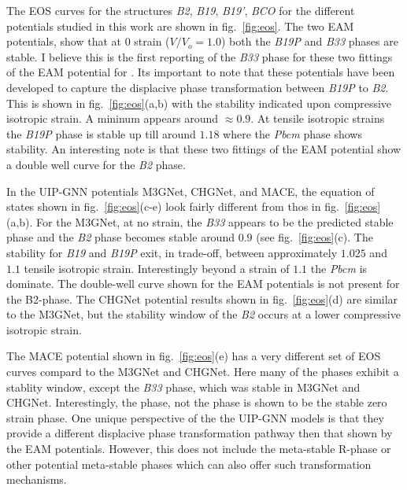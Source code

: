 \documentclass[preprint,colorlinks=true,linkcolor=black,citecolor=black]{elsarticle}
\begin{document}
The EOS curves for the  structures \textit{B2}, \textit{B19}, \textit{B19'}, \textit{BCO} for the different potentials studied in this work are shown in fig.~\ref{fig:eos}. The two EAM potentials, show that at 0 strain ($V/V_o = 1.0$) both the \textit{B19P} and \textit{B33} phases are stable. I believe this is the first reporting of the \textit{B33} phase for these two fittings of the EAM potential for . Its important to note that these potentials have been developed to capture the displacive phase transformation between \textit{B19P} to \textit{B2}. This is shown in fig.~\ref{fig:eos}(a,b) with the stability indicated upon compressive isotropic strain. A mininum appears around $\approx 0.9$. At tensile isotropic strains the \textit{B19P} phase is stable up till around $1.18$ where the \textit{Pbcm} phase shows stability. An interesting note is that these two fittings of the EAM potential show a double well curve for the \textit{B2} phase. \par

In the UIP-GNN potentials M3GNet, CHGNet, and MACE, the equation of states shown in fig.~\ref{fig:eos}(c-e) look fairly different from thos in fig.~\ref{fig:eos}(a,b). For the M3GNet,  at no strain, the \textit{B33} appears to be the predicted stable phase and the \textit{B2} phase becomes stable around $0.9$ (see fig.~\ref{fig:eos}(c). The stability for \textit{B19} and \textit{B19P} exit, in trade-off, between approximately $1.025$ and $1.1$ tensile isotropic strain. Interestingly beyond a strain of $1.1$ the \textit{Pbcm} is dominate. The double-well curve shown for the EAM potentials is not present for the B2-phase. The CHGNet potential results shown in fig.~\ref{fig:eos}(d) are similar to the M3GNet, but the stability window of the \textit{B2} occurs at a lower compressive isotropic strain. \par

The MACE potential shown in fig.~\ref{fig:eos}(e) has a very different set of EOS curves compard to the M3GNet and CHGNet. Here many of the phases exhibit a stablity window, except the \textit{B33} phase, which was stable in M3GNet and CHGNet. Interestingly, the  phase, not the  phase is shown to be the stable zero strain phase. One unique perspective of the the UIP-GNN models is that they provide a different displacive phase transformation pathway then that shown by the EAM potentials. However, this does not include the meta-stable R-phase or other potential meta-stable phases which can also offer such transformation mechanisms. \par
\end{document}
